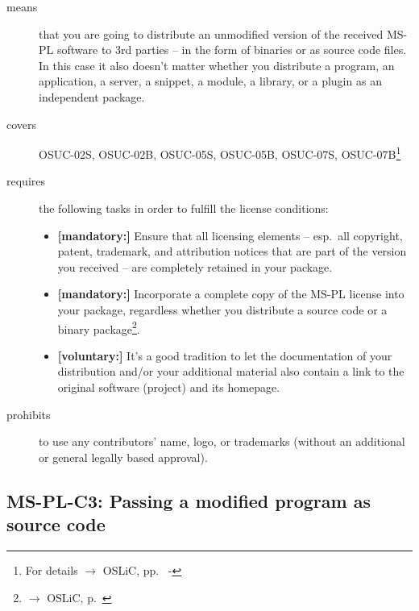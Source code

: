 \begin{description}
\item[means] that you are going to distribute an unmodified version of the
received MS-PL software to 3rd parties -- in the form of binaries or as source
code files. In this case it also doesn't matter whether you distribute a
program, an application, a server, a snippet, a module, a library, or a plugin
as an independent package.

\item[covers] OSUC-02S, OSUC-02B, OSUC-05S,  OSUC-05B, OSUC-07S,
OSUC-07B\footnote{For details $\rightarrow$ OSLiC, pp.\ \pageref{OSUC-02B-DEF} -
\pageref{OSUC-07B-DEF}}

\item[requires] the following tasks in order to fulfill the license conditions:
\begin{itemize}
  \item \textbf{[mandatory:]} Ensure that all licensing elements -- esp.\ all
  copyright, patent, trademark, and attribution notices that are part of the
  version you received -- are completely retained in your package.
  
  \item \textbf{[mandatory:]} Incorporate a complete copy of the MS-PL license
  into your package, regardless whether you distribute a source code or a binary
  package\footnote{$\rightarrow$ OSLiC, p.\ \pageref{MsplSourceBinHint}}.
  
  \item \textbf{[voluntary:]} It's a good tradition to let the documentation of
  your distribution and/or your additional material also contain a link to the
  original software (project) and its homepage.
\end{itemize}

\item[prohibits] to use any contributors' name, logo, or trademarks (without an
additional or general legally based approval).

\end{description}

\subsection{MS-PL-C3: Passing a modified program as source code}
\label{OSUC-04S-MS-PL}

